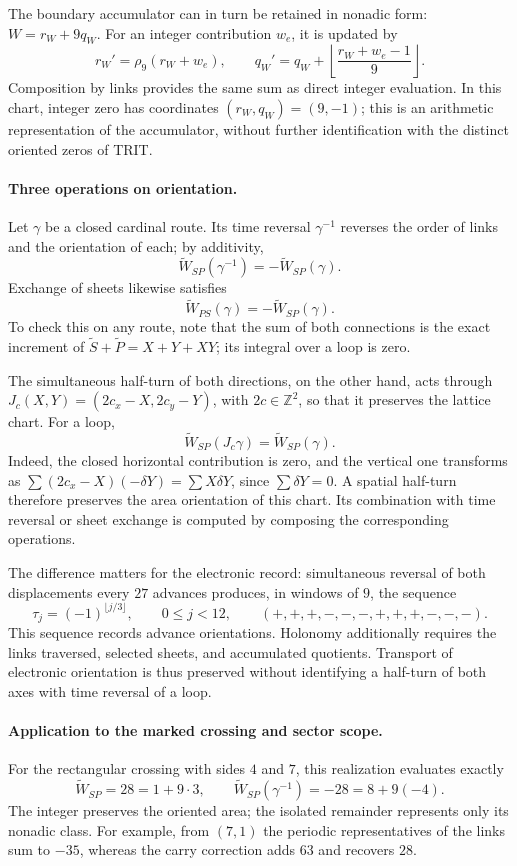 The boundary accumulator can in turn be retained in nonadic form:
$W=r_W+9q_W$. For an integer contribution $w_e$, it is updated by
\[
 r_W'=\rho_9(r_W+w_e),\qquad
 q_W'=q_W+\left\lfloor\frac{r_W+w_e-1}{9}\right\rfloor.
\]
Composition by links provides the same sum as direct integer
evaluation. In this chart, integer zero has coordinates
$(r_W,q_W)=(9,-1)$; this is an arithmetic representation of the accumulator,
without further identification with the distinct oriented zeros of TRIT.

\paragraph{Three operations on orientation.}
Let $\gamma$ be a closed cardinal route. Its time reversal
$\gamma^{-1}$ reverses the order of links and the orientation of each;
by additivity,
\[
 \widetilde W_{SP}(\gamma^{-1})=-\widetilde W_{SP}(\gamma).
\]
Exchange of sheets likewise satisfies
\[
 \widetilde W_{PS}(\gamma)=-\widetilde W_{SP}(\gamma).
\]
To check this on any route, note that the sum of both
connections is the exact increment of
$\widetilde S+\widetilde P=X+Y+XY$; its integral over a loop is zero.

The simultaneous half-turn of both directions, on the other hand, acts
through $J_c(X,Y)=(2c_x-X,2c_y-Y)$, with $2c\in\mathbb Z^2$,
so that it preserves the lattice chart. For a loop,
\[
 \widetilde W_{SP}(J_c\gamma)=\widetilde W_{SP}(\gamma).
\]
Indeed, the closed horizontal contribution is zero, and the vertical one
transforms as
$\sum (2c_x-X)(-\delta Y)=\sum X\delta Y$, since
$\sum\delta Y=0$. A spatial half-turn therefore preserves the
area orientation of this chart. Its combination with time reversal
or sheet exchange is computed by composing the corresponding
operations.

The difference matters for the electronic record: simultaneous reversal
of both displacements every $27$ advances produces, in
windows of $9$, the sequence
\[
 \tau_j=(-1)^{\lfloor j/3\rfloor},\qquad 0\leq j<12,
 \qquad (+,+,+,-,-,-,+,+,+,-,-,-).
\]
This sequence records advance orientations. Holonomy additionally requires
the links traversed, selected sheets, and accumulated
quotients. Transport of electronic orientation is thus preserved
without identifying a half-turn of both axes with time reversal
of a loop.

\paragraph{Application to the marked crossing and sector scope.}
For the rectangular crossing with sides $4$ and $7$, this realization evaluates
exactly
\[
 \widetilde W_{SP}=28=1+9\cdot3,\qquad
 \widetilde W_{SP}(\gamma^{-1})=-28=8+9(-4).
\]
The integer preserves the oriented area; the isolated remainder represents only
its nonadic class. For example, from $(7,1)$ the periodic
representatives of the links sum to $-35$, whereas the carry correction
adds $63$ and recovers $28$.

